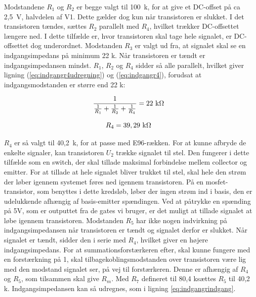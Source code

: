 Modstandene $R_1$ og $R_2$ er begge valgt til 100~k\ohm, for at give et DC-offset på ca 2,5~V, halvdelen af V1. Dette gælder dog kun når transistoren er slukket. I det transistoren tændes, sættes $R_2$ parallelt med $R_4$, hvilket trækker DC-offsettet længere ned.
I dette tilfælde er, hvor transistoren skal tage hele signalet, er DC-offsettet dog underordnet. 
Modstanden $R_3$ er valgt ud fra, at signalet skal se en indgangsimpedans på minimum 22 k\ohm. Når transistoren er tændt er indgangsimpedansen mindst. $R_1$, $R_2$ og $R_4$ sidder så alle parallelt, hvilket giver ligning (\ref{eq:indgangr4udregning}) og (\ref{eq:indgangr4}), forudsat at indgangsmodstanden er større end 22 k\ohm:

\begin{equation}
\label{eq:indgangr4udregning}
\frac{1}{\frac{1}{R_1}+\frac{1}{R_2}+\frac{1}{R_4}}=22~\mathrm{k}\ohm
\end{equation}

\begin{equation}
\label{eq:indgangr4}
R_4=39,29~\mathrm{k}\ohm
\end{equation}

$R_4$ er så valgt til 40,2~k\ohm, for at passe med E96-rækken.
For at kunne afbryde de enkelte signaler, kan transistoren $U_2$ trække signalet til stel. Den fungerer i dette tilfælde som en switch, der skal tillade maksimal forbindelse mellem collector og emitter. For at tillade at hele signalet bliver trukket til stel, skal hele den strøm der løber igennem systemet føres ned igennem transistoren. På en mosfet-transistor, som benyttes i dette kredsløb, løber der ingen strøm ind i basis, den er udelukkende afhængig af basis-emitter spændingen. Ved at påtrykke en spænding på 5V, som er outputtet fra de gates vi bruger, er det muligt at tillade signalet at løbe igennem transistoren.
Modstanden $R_5$ har ikke nogen indvirkning på indgangsimpedansen når transistoren er tændt og signalet derfor er slukket. Når signalet er tændt, sidder den i serie med $R_4$, hvilket giver en højere indgangsimpedans. For at summationsforstærkeren efter, skal kunne fungere med en forstærkning på 1, skal tilbagekoblingsmodstanden over transistoren være lig med den modstand signalet ser, på vej til forstærkeren. Denne er afhængig af $R_4$ og $R_5$, som tilsammen skal give $R_m$. Med $R_7$ defineret til 80,4 k\ohm sættes $R_5$ til 40,2 k\ohm . Indgangsimpedansen kan så udregnes, som i ligning \ref{eq:indgangrindgang}.

